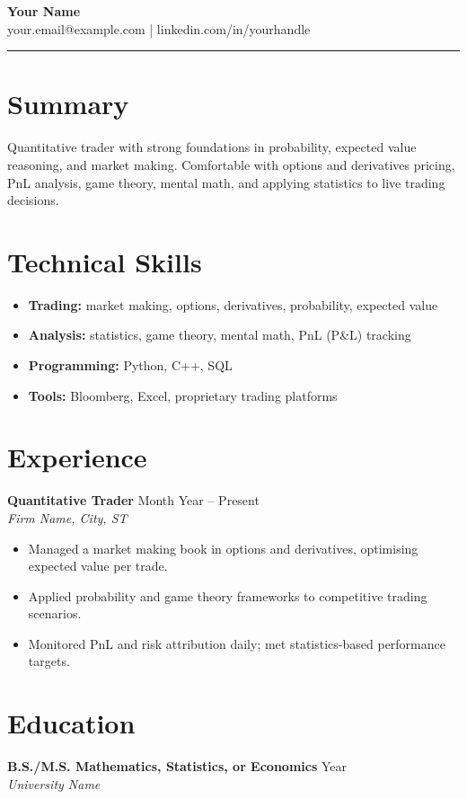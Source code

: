 \documentclass[11pt,letterpaper]{article}
\begin{document}
{\Large \textbf{Your Name}} \\
your.email@example.com \quad | \quad linkedin.com/in/yourhandle

\bigskip
\hrule
\bigskip

\section*{Summary}
Quantitative trader with strong foundations in probability, expected value reasoning,
and market making. Comfortable with options and derivatives pricing, PnL analysis,
game theory, mental math, and applying statistics to live trading decisions.

\section*{Technical Skills}
\begin{itemize}[leftmargin=*]
  \item \textbf{Trading:} market making, options, derivatives, probability, expected value
  \item \textbf{Analysis:} statistics, game theory, mental math, PnL (P\&L) tracking
  \item \textbf{Programming:} Python, C++, SQL
  \item \textbf{Tools:} Bloomberg, Excel, proprietary trading platforms
\end{itemize}

\section*{Experience}

\textbf{Quantitative Trader} \hfill Month Year -- Present \\
\textit{Firm Name, City, ST}
\begin{itemize}[leftmargin=*]
  \item Managed a market making book in options and derivatives, optimising expected value per trade.
  \item Applied probability and game theory frameworks to competitive trading scenarios.
  \item Monitored PnL and risk attribution daily; met statistics-based performance targets.
\end{itemize}

\section*{Education}
\textbf{B.S./M.S. Mathematics, Statistics, or Economics} \hfill Year \\
\textit{University Name}
\end{document}
